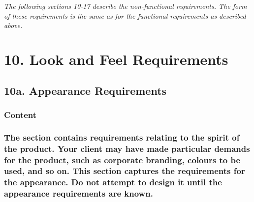 \documentclass[
]{article}
\begin{document}
\emph{The following sections 10-17 describe the non-functional
requirements. The form of these requirements is the same as for the
functional requirements as described above.}

\hypertarget{look-and-feel-requirements}{%
\section{\texorpdfstring{10. Look and Feel Requirements
}{10. Look and Feel Requirements }}\label{look-and-feel-requirements}}

\hypertarget{a.-appearance-requirements}{%
\subsection{\texorpdfstring{10a. Appearance Requirements
}{10a. Appearance Requirements }}\label{a.-appearance-requirements}}

\hypertarget{content-30}{%
\subsubsection{Content}\label{content-30}}

\hypertarget{the-section-contains-requirements-relating-to-the-spirit-of-the-product.-your-client-may-have-made-particular-demands-for-the-product-such-as-corporate-branding-colours-to-be-used-and-so-on.-this-section-captures-the-requirements-for-the-appearance.-do-not-attempt-to-design-it-until-the-appearance-requirements-are-known.}{%
\subsubsection{\texorpdfstring{The section contains requirements
relating to the spirit of the product. Your client may have made
particular demands for the product, such as corporate branding, colours
to be used, and so on. This section captures the requirements for the
appearance. Do not attempt to design it until the appearance
requirements are known.
}{The section contains requirements relating to the spirit of the product. Your client may have made particular demands for the product, such as corporate branding, colours to be used, and so on. This section captures the requirements for the appearance. Do not attempt to design it until the appearance requirements are known. }}\label{the-section-contains-requirements-relating-to-the-spirit-of-the-product.-your-client-may-have-made-particular-demands-for-the-product-such-as-corporate-branding-colours-to-be-used-and-so-on.-this-section-captures-the-requirements-for-the-appearance.-do-not-attempt-to-design-it-until-the-appearance-requirements-are-known.}}
\end{document}
